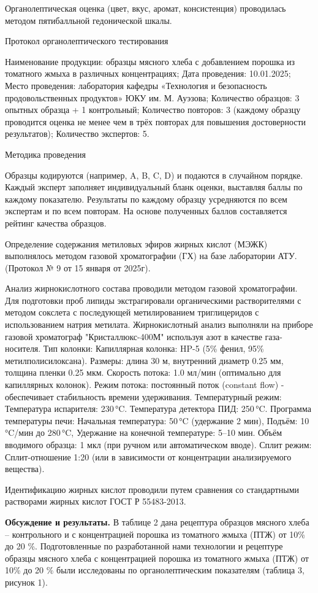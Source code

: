 \begin{multicols}{2}
Органолептическая оценка (цвет, вкус, аромат, консистенция) проводилась
методом пятибалльной гедонической шкалы.

Протокол органолептического тестирования

Наименование продукции: образцы мясного хлеба с добавлением порошка из
томатного жмыха в различных концентрациях; Дата проведения: 10.01.2025;
Место проведения: лаборатория кафедры «Технология и безопасность
продовольственных продуктов» ЮКУ им. М. Ауэзова; Количество образцов: 3
опытных образца + 1 контрольный; Количество повторов: 3 (каждому образцу
проводится оценка не менее чем в трёх повторах для повышения
достоверности результатов); Количество экспертов: 5.

Методика проведения

Образцы кодируются (например, A, B, C, D) и подаются в случайном
порядке. Каждый эксперт заполняет индивидуальный бланк оценки, выставляя
баллы по каждому показателю. Результаты по каждому образцу усредняются
по всем экспертам и по всем повторам. На основе полученных баллов
составляется рейтинг качества образцов.

Определение содержания метиловых эфиров жирных кислот (МЭЖК) выполнялось
методом газовой хроматографии (ГХ) на базе лаборатории АТУ. (Протокол №
9 от 15 января от 2025г).

Анализ жирнокислотного состава проводили методом газовой хроматографии.
Для подготовки проб липиды экстрагировали органическими растворителями с
методом сокслета с последующей метилированием триглицеридов с
использованием натрия метилата. Жирнокислотный анализ выполняли на
приборе газовой хроматограф "Кристаллюкс-400М" используя азот в качестве
газа-носителя. Тип колонки: Капиллярная колонка: HP-5 (5\% фенил, 95\%
метилполисилоксана). Размеры: длина 30 м, внутренний диаметр 0.25 мм,
толщина пленки 0.25 мкм. Скорость потока: 1.0 мл/мин (оптимально для
капиллярных колонок). Режим потока: постоянный поток (constant flow) -
обеспечивает стабильность времени удерживания. Температурный режим:
Температура испарителя: 230\,°C. Температура детектора ПИД: 250\,°C.
Программа температуры печи: Начальная температура: 50\,°C (удержание 2
мин), Подъём: 10\,°C/мин до 280\,°C, Удержание на конечной температуре:
5--10 мин. Объём вводимого образца: 1 мкл (при ручном или автоматическом
вводе). Сплит режим: Сплит-отношение 1:20 (или в зависимости от
концентрации анализируемого вещества).

Идентификацию жирных кислот проводили путем сравнения со стандартными
растворами жирных кислот ГОСТ Р 55483-2013.

{\bfseries Обсуждение и результаты.} В таблице 2 дана рецептура образцов
мясного хлеба -- контрольного и с концентрацией порошка из томатного
жмыха (ПТЖ) от 10\% до 20 \%. Подготовленные по разработанной нами
технологии и рецептуре образцы мясного хлеба с концентрацией порошка из
томатного жмыха (ПТЖ) от 10\% до 20 \% были исследованы по
органолептическим показателям (таблица 3, рисунок 1).
\end{multicols}

